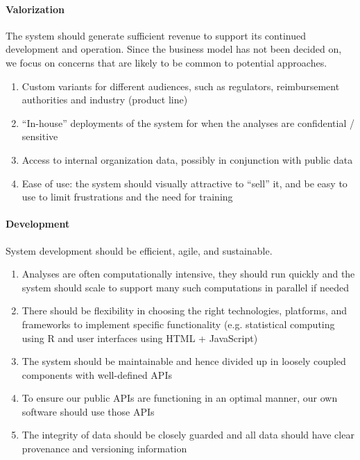 \documentclass[a4paper]{article}
\begin{document}
\paragraph{Valorization}
The system should generate sufficient revenue to support its continued development and operation.
Since the business model has not been decided on, we focus on concerns that are likely to be common to potential approaches.
\begin{enumerate}[label=V\arabic*]
\item\label{vProductLine} Custom variants for different audiences, such as regulators, reimbursement authorities and industry (product line)
\item\label{vInHouse} ``In-house'' deployments of the system for when the analyses are confidential / sensitive
\item\label{vSilo} Access to internal organization data, possibly in conjunction with public data
\item\label{vEaseOfUse} Ease of use: the system should visually attractive to ``sell'' it, and be easy to use to limit frustrations and the need for training
\end{enumerate}

\paragraph{Development}
System development should be efficient, agile, and sustainable.
\begin{enumerate}[label=D\arabic*]
\item\label{dComputation} Analyses are often computationally intensive, they should run quickly and the system should scale to support many such computations in parallel if needed
\item\label{dPlatform} There should be flexibility in choosing the right technologies, platforms, and frameworks to implement specific functionality (e.g. statistical computing using R and user interfaces using HTML + JavaScript)
\item\label{dModular} The system should be maintainable and hence divided up in loosely coupled components with well-defined APIs
\item\label{dDogfood} To ensure our public APIs are functioning in an optimal manner, our own software should use those APIs
\item\label{dIntegrity} The integrity of data should be closely guarded and all data should have clear provenance and versioning information
\end{enumerate}
\end{document}
